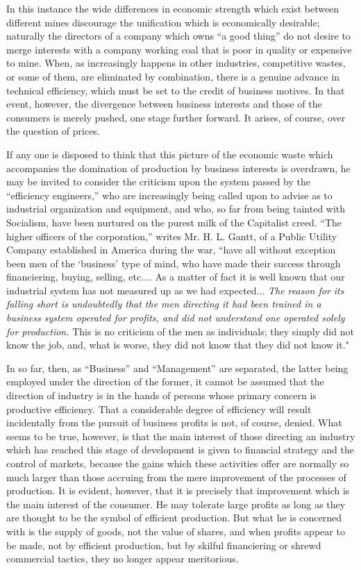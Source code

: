 \documentclass{book}
\begin{document}
In this instance the wide differences in economic strength which exist between different mines discourage the unification which is economically desirable; naturally the directors of a company which owns “a good thing” do not desire to merge interests with a company working coal that is poor in quality or expensive to mine. When, as increasingly happens in other industries, competitive wastes, or some of them, are eliminated by combination, there is a genuine advance in technical efficiency, which must be set to the credit of business motives. In that event, however, the divergence between business interests and those of the consumers is merely pushed, one stage further forward. It arises, of course, over the question of prices.

If any one is disposed to think that this picture of the economic waste which accompanies the domination of production by business interests is overdrawn, he may be invited to consider the criticism upon the system passed by the “efficiency engineers,” who are increasingly being called upon to advise as to industrial organization and equipment, and who, so far from being tainted with Socialism, have been nurtured on the purest milk of the Capitalist creed. “The higher officers of the corporation,” writes Mr. H. L. Gantt, of a Public Utility Company established in America during the war, “have all without exception been men of the ‘business’ type of mind, who have made their success through financiering, buying, selling, etc.... As a matter of fact it is well known that our industrial system has not measured up as we had expected... \emph{The reason for its falling short is undoubtedly that the men directing it had been trained in a business system operated for profits, and did not understand one operated solely for production.} This is no criticism of the men as individuals; they simply did not know the job, and, what is worse, they did not know that they did not know it."

In so far, then, as “Business” and “Management” are separated, the latter being employed under the direction of the former, it cannot be assumed that the direction of industry is in the hands of persons whose primary concern is productive efficiency. That a considerable degree of efficiency will result incidentally from the pursuit of business profits is not, of course, denied. What seems to be true, however, is that the main interest of those directing an industry which has reached this stage of development is given to financial strategy and the control of markets, because the gains which these activities offer are normally so much larger than those accruing from the mere improvement of the processes of production. It is evident, however, that it is precisely that improvement which is the main interest of the consumer. He may tolerate large profits as long as they are thought to be the symbol of efficient production. But what he is concerned with is the supply of goods, not the value of shares, and when profits appear to be made, not by efficient production, but by skilful financiering or shrewd commercial tactics, they no longer appear meritorious.
\end{document}
